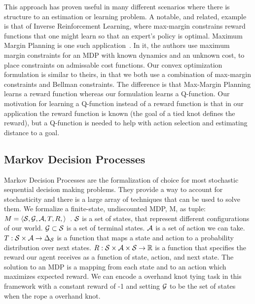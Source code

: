 This approach has proven useful in many different scenarios where there is structure to an estimation or learning problem.
A notable, and related, example is that of Inverse Reinforcement Learning, where max-margin constrains reward functions that one might learn so that an expert's policy is optimal.
Maximum Margin Planning is one such application~\cite{Ratliff_ICML06}.
In it, the authors use maximum margin constraints for an MDP with known dynamics and an unknown cost, to place constraints on admissable cost functions.
Our convex optimization formulation is similar to theirs, in that we both use a combination of max-margin constraints and Bellman constraints.
The difference is that Max-Margin Planning learns a reward function whereas our formulation learns a Q-function.
Our motivation for learning a Q-function instead of a reward function is that in our application the reward function is known (the goal of a tied knot defines the reward), but a Q-function is needed to help with action selection and estimating distance to a goal.



\subsection{Markov Decision Processes}
Markov Decision Processes are the formalization of choice for most stochastic sequential decision making problems.
They provide a way to account for stochasticity and there is a large array of techniques that can be used to solve them.
We formalize a finite-state, undiscounted MDP, M, as tuple: $M = \langle\mathcal{S},\mathcal{G}, \mathcal{A},T,R, \rangle$~\cite{puterman1994}.
$\mathcal{S}{}$ is a set of states, that represent different configurations of our world.
$\mathcal{G}{} \subset \mathcal{S}{}$ is a set of terminal states.  
$\mathcal{A}{}$ is a set of action we can take.
$T:\mathcal{S}{} \times \mathcal{A}{} \rightarrow \Delta_{\mathcal{S}{}}$ is a function that maps a state and action to a probability distribution over next states.
$R:\mathcal{S}{}\times \mathcal{A}{} \times \mathcal{S}{} \rightarrow \mathbb{R}$ is a function that specifies the reward our agent receives as a function of state, action, and next state.
The solution to an MDP is a mapping from each state and to an action which maximizes expected reward. 
We can encode a overhand knot tying task in this framework with a constant reward of -1 
and setting $\mathcal{G}{}$ to be the set of states when the rope a overhand knot.

